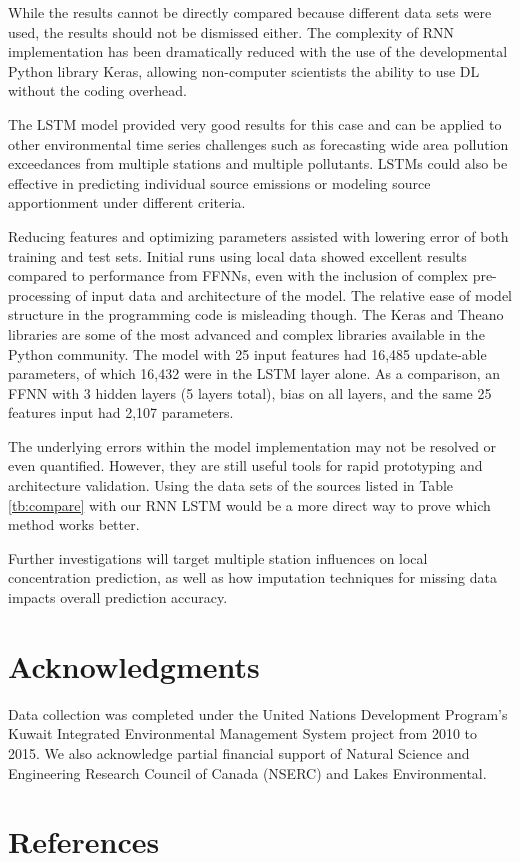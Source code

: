 \documentclass[preprint,12pt,a4paper,authoryear]{elsarticle}
\begin{document}
\begin{linenumbers}
While the results cannot be directly compared because different data sets were used, the results should not be dismissed either. The complexity of RNN implementation has been dramatically reduced with the use of the developmental Python library Keras, allowing non-computer scientists the ability to use DL without the coding overhead.

The LSTM model provided very good results for this case and can be applied to other environmental time series challenges such as forecasting wide area pollution exceedances from multiple stations and multiple pollutants. LSTMs could also be effective in predicting individual source emissions or modeling source apportionment under different criteria. 

Reducing features and optimizing parameters assisted with lowering error of both training and test sets. Initial runs using local data showed excellent results compared to performance from FFNNs, even with the inclusion of complex pre-processing of input data and architecture of the model. The relative ease of model structure in the programming code is misleading though. The Keras and Theano libraries are some of the most advanced and complex libraries available in the Python community. The model with 25 input features had 16,485 update-able parameters, of which 16,432 were in the LSTM layer alone.  As a comparison, an FFNN with 3 hidden layers (5 layers total), bias on all layers, and the same 25 features input had 2,107 parameters.

The underlying errors within the model implementation may not be resolved or even quantified. However, they are still useful tools for rapid prototyping and architecture validation. Using the data sets of the sources listed in Table \ref{tb:compare} with our RNN LSTM would be a more direct way to prove which method works better.

Further investigations will target multiple station influences on local concentration prediction, as well as how imputation techniques for missing data impacts overall prediction accuracy. 

\section{Acknowledgments}
Data collection was completed under the United Nations Development Program's Kuwait Integrated Environmental Management System project from 2010 to 2015.  We also acknowledge partial financial support of Natural Science and Engineering Research Council of Canada (NSERC) and Lakes Environmental.
 
\section{References}

\end{linenumbers}
{}

\end{document}
